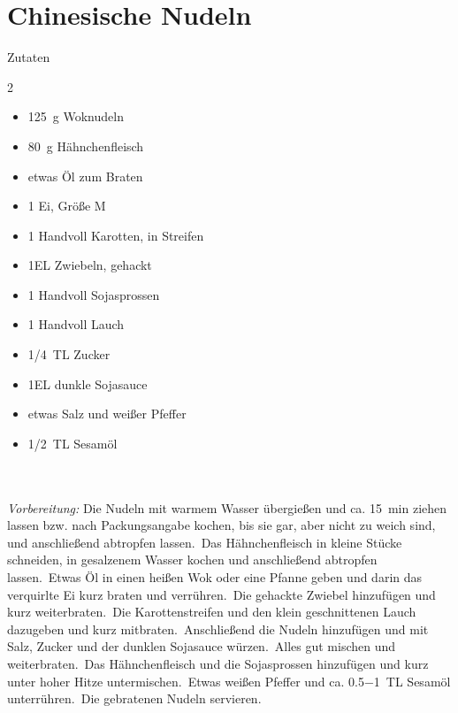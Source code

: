 \section*{Chinesische Nudeln}
\ihead{}\ohead{}
\cfoot{}
{\Large Zutaten}
\begin{multicols}{2}
\begin{itemize}
\item \SI{125}{g} Woknudeln
\item \SI{80}{g} Hähnchenfleisch
\item etwas Öl zum Braten
\item \num{1} Ei, Größe M
\item \num{1} Handvoll Karotten, in Streifen
\item \num{1}{EL} Zwiebeln, gehackt
\item \num{1} Handvoll Sojasprossen
\item \num{1} Handvoll Lauch
\item \SI{1/4}{TL} Zucker
\item \num{1}{EL} dunkle Sojasauce
\item etwas Salz und weißer Pfeffer
\item \SI{1/2}{TL} Sesamöl
\end{itemize}
\end{multicols}
\\
\\
\textit{Vorbereitung:} Die Nudeln mit warmem Wasser übergießen und ca. \SI{15}{min} ziehen lassen bzw. nach Packungsangabe kochen, bis sie gar, aber nicht zu weich sind, und anschließend abtropfen lassen.\
Das Hähnchenfleisch in kleine Stücke schneiden, in gesalzenem Wasser kochen und anschließend abtropfen lassen.\
Etwas Öl in einen heißen Wok oder eine Pfanne geben und darin das verquirlte Ei kurz braten und verrühren.\
Die gehackte Zwiebel hinzufügen und kurz weiterbraten.\
Die Karottenstreifen und den klein geschnittenen Lauch dazugeben und kurz mitbraten.\
Anschließend die Nudeln hinzufügen und mit Salz, Zucker und der dunklen Sojasauce würzen.\
Alles gut mischen und weiterbraten.\
Das Hähnchenfleisch und die Sojasprossen hinzufügen und kurz unter hoher Hitze untermischen.\
Etwas weißen Pfeffer und ca. \SI{0,5-1}{TL} Sesamöl unterrühren.\
Die gebratenen Nudeln servieren.
